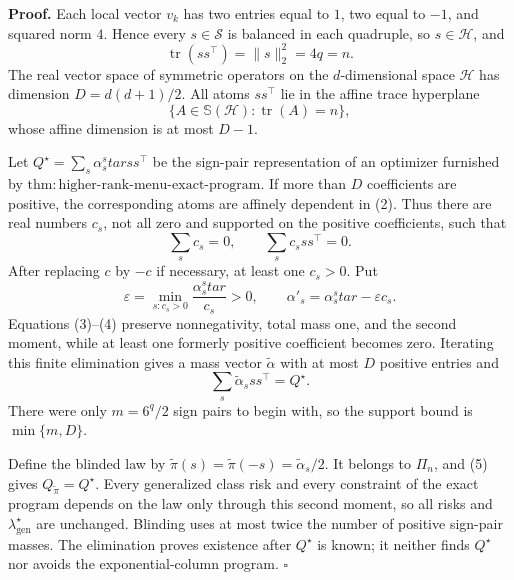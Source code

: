 \textbf{Proof.}
Each local vector \(v_k\) has two entries equal to \(1\), two equal to \(-1\), and squared norm \(4\).  Hence every \(s\in\mathscr S\) is balanced in each quadruple, so \(s\in\mathcal H\), and
\[
\operatorname{tr}(ss^\top)=\|s\|_2^2=4q=n.
\tag{1}
\]
The real vector space of symmetric operators on the \(d\)-dimensional space \(\mathcal H\) has dimension \(D=d(d+1)/2\).  All atoms \(ss^\top\) lie in the affine trace hyperplane
\[
\{A\in\mathbb S(\mathcal H):\operatorname{tr}(A)=n\},
\tag{2}
\]
whose affine dimension is at most \(D-1\).

Let \(Q^\star=\sum_s\alpha_s^star ss^\top\) be the sign-pair representation of an optimizer furnished by \(\mathrm{thm:higher\text{-}rank\text{-}menu\text{-}exact\text{-}program}\).  If more than \(D\) coefficients are positive, the corresponding atoms are affinely dependent in (2).  Thus there are real numbers \(c_s\), not all zero and supported on the positive coefficients, such that
\[
\sum_sc_s=0,
\qquad
\sum_sc_sss^\top=0.
\tag{3}
\]
After replacing \(c\) by \(-c\) if necessary, at least one \(c_s>0\).  Put
\[
\varepsilon=\min_{s:c_s>0}\frac{\alpha_s^star}{c_s}>0,
\qquad
\alpha'_s=\alpha_s^star-\varepsilon c_s.
\tag{4}
\]
Equations (3)--(4) preserve nonnegativity, total mass one, and the second moment, while at least one formerly positive coefficient becomes zero.  Iterating this finite elimination gives a mass vector \(\widetilde\alpha\) with at most \(D\) positive entries and
\[
\sum_s\widetilde\alpha_s ss^\top=Q^\star.
\tag{5}
\]
There were only \(m=6^q/2\) sign pairs to begin with, so the support bound is \(\min\{m,D\}\).

Define the blinded law by \(\widetilde\pi(s)=\widetilde\pi(-s)=\widetilde\alpha_s/2\).  It belongs to \(\Pi_n\), and (5) gives \(Q_{\widetilde\pi}=Q^\star\).  Every generalized class risk and every constraint of the exact program depends on the law only through this second moment, so all risks and \(\lambda_{\mathrm{gen}}^\star\) are unchanged.  Blinding uses at most twice the number of positive sign-pair masses.  The elimination proves existence after \(Q^\star\) is known; it neither finds \(Q^\star\) nor avoids the exponential-column program.  \(\square\)